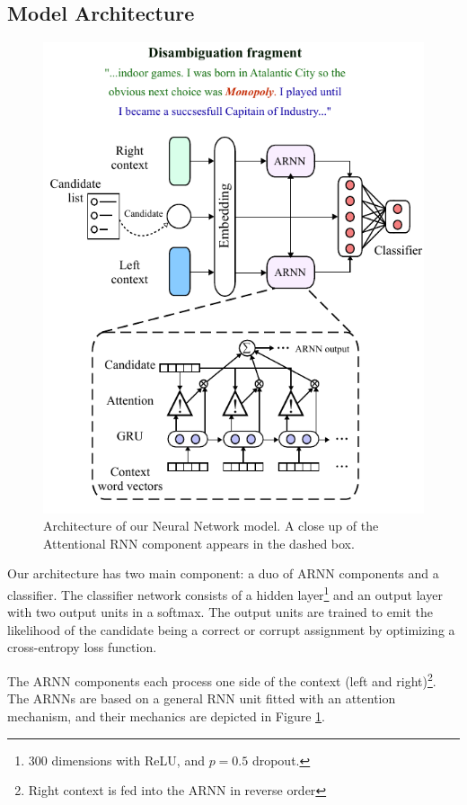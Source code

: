 \documentclass[11pt]{article}
\begin{document}
\subsection{Model Architecture}

\begin{figure}
	\centering
	\includegraphics[scale=0.9]{diagrams/model_color_v4.pdf}
	\caption{Architecture of our Neural Network model. A close up of the Attentional RNN component appears in the dashed box.}
	\label{fig:arnn}
\end{figure}	
  
Our architecture has two main component: a duo of ARNN components and a classifier. The classifier network consists of a hidden layer\footnote{300 dimensions with ReLU, and $p=0.5$ dropout.} and an output layer with two output units in a softmax. The output units are trained to emit the likelihood of the candidate being a correct or corrupt assignment by optimizing a cross-entropy loss function. 

The ARNN components each process one side of the context (left and right)\footnote{Right context is fed into the ARNN in reverse order}. The ARNNs are based on a general RNN unit fitted with an attention mechanism, and their mechanics are depicted in Figure \ref{fig:arnn}. 
\end{document}
